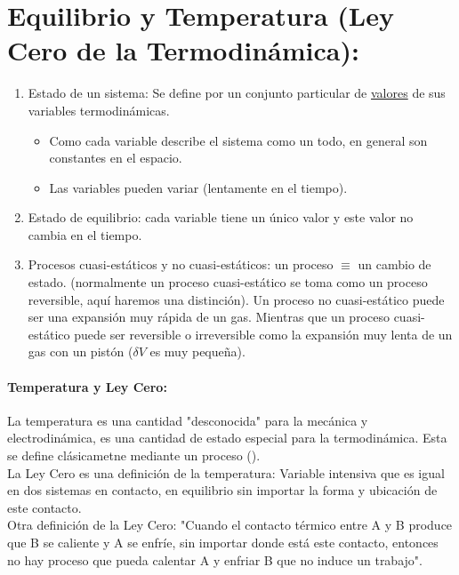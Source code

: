 \section{Equilibrio y Temperatura (Ley Cero de la Termodinámica):}

\begin{enumerate}
	\item Estado de un sistema: Se define por un conjunto particular de \underline{valores} de sus variables termodinámicas.
	\begin{itemize}
		\item Como cada variable describe el sistema como un todo, en general son constantes en el espacio.
		\item Las variables pueden variar (lentamente en el tiempo).
	\end{itemize}
	\item Estado de equilibrio: cada variable tiene un único valor y este valor no cambia en el tiempo.
	\item Procesos cuasi-estáticos y no cuasi-estáticos: un proceso $\equiv$ un cambio de estado. (normalmente un proceso cuasi-estático se toma como un proceso reversible, aquí haremos una distinción). Un proceso no cuasi-estático puede ser una expansión muy rápida de un gas. Mientras que un proceso cuasi-estático puede ser reversible o irreversible como la expansión muy lenta de un gas con un pistón ($\delta V$ es muy pequeña). 
\end{enumerate}

\paragraph{Temperatura y Ley Cero: } La temperatura es una cantidad "desconocida" para la mecánica y electrodinámica, es una cantidad de estado especial para la termodinámica. Esta se define clásicametne mediante un proceso (). \\
La Ley Cero es una definición de la temperatura: Variable intensiva que es igual en dos sistemas en contacto, en equilibrio sin importar la forma y ubicación de este contacto. \\
Otra definición de la Ley Cero: "Cuando el contacto térmico entre A y B produce que B se caliente y A se enfríe, sin importar donde está este contacto, entonces no hay proceso que pueda calentar A y enfriar B que no induce un trabajo". \\


